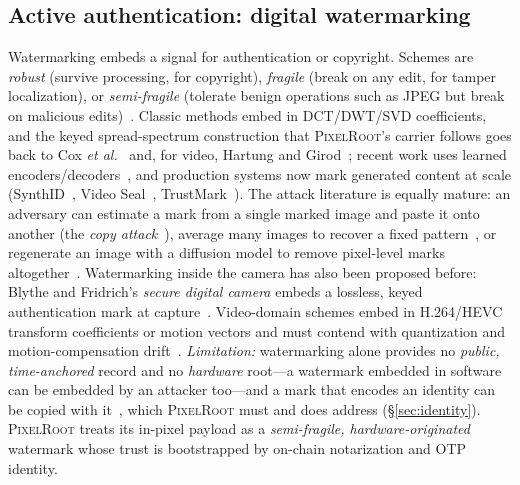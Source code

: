 \documentclass[journal]{IEEEtran}
\newcommand{\pr}{\textup{\textsc{PixelRoot}}}
\begin{document}
\subsection{Active authentication: digital watermarking}
Watermarking embeds a signal for authentication or copyright. Schemes are
\emph{robust} (survive processing, for copyright), \emph{fragile} (break on any
edit, for tamper localization), or \emph{semi-fragile} (tolerate benign
operations such as JPEG but break on malicious
edits)~\cite{begum2020digital,fragile2025hybrid}. Classic methods embed in
DCT/DWT/SVD coefficients, and the keyed spread-spectrum construction that
\pr{}'s carrier follows goes back to Cox \emph{et al.}~\cite{cox1997secure} and,
for video, Hartung and Girod~\cite{hartung1998watermarking}; recent work uses
learned encoders/decoders~\cite{dlwatermarking2026}, and production systems now
mark generated content at scale (SynthID~\cite{gowal2025synthid}, Video
Seal~\cite{fernandez2024videoseal}, TrustMark~\cite{bui2023trustmark}). The attack
literature is equally mature: an adversary can estimate a mark from a single
marked image and paste it onto another (the \emph{copy attack}~\cite{kutter2000copy}),
average many images to recover a fixed pattern~\cite{yang2024steganalysis}, or
regenerate an image with a diffusion model to remove pixel-level marks
altogether~\cite{zhao2024invisible,saberi2024robustness}. Watermarking inside the
camera has also been proposed before: Blythe and Fridrich's \emph{secure digital
camera} embeds a lossless, keyed authentication mark at capture~\cite{blythe2004secure}. Video-domain schemes embed in
H.264/HEVC transform coefficients or motion vectors and must contend with
quantization and motion-compensation
drift~\cite{videowatermark2018survey,hevcwatermark2020,cstfmark2026}.
\emph{Limitation:} watermarking alone provides no \emph{public, time-anchored}
record and no \emph{hardware} root---a watermark embedded in software can be
embedded by an attacker too---and a mark that encodes an identity can be copied
with it~\cite{kutter2000copy}, which \pr{} must and does address
(\S\ref{sec:identity}). \pr{} treats its in-pixel payload as a
\emph{semi-fragile, hardware-originated} watermark whose trust is bootstrapped
by on-chain notarization and OTP identity.
\end{document}
